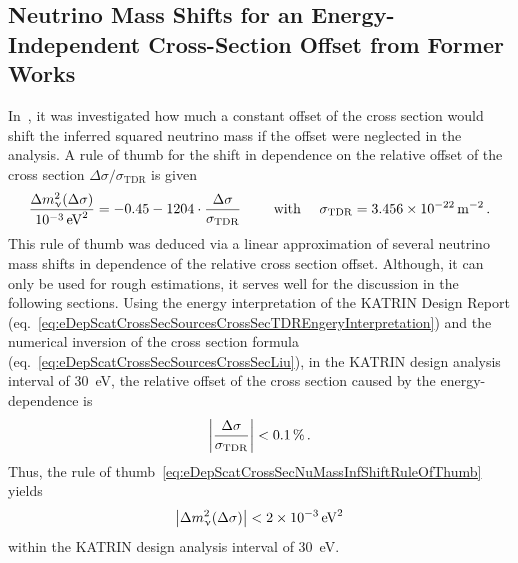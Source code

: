 \subsection{Neutrino Mass Shifts for an Energy-Independent Cross-Section Offset from Former Works}
\label{sec:eDepScatCrossSecNuMassInfGroh}
In~\cite{Groh2015}, it was investigated how much a constant offset of the cross section would shift the inferred squared neutrino mass if the offset were neglected in the analysis. A rule of thumb for the shift in dependence on the relative offset of the cross section $\Delta\sigma/\sigma_\mathrm{TDR}$ is given~\cite{Groh2015}
\begin{equation}
	\label{eq:eDepScatCrossSecNuMassInfShiftRuleOfThumb}
	\frac{\Delta m_\upnu^2(\Delta\sigma)}{\SI{e-3}{eV^2}} =
	-0.45
	-1204\cdot
	\frac{
		\Delta\sigma
	}{
		\sigma_\mathrm{TDR}
	}
	\qquad \text{ with } \quad 
	\sigma_\mathrm{TDR} = \SI{3.456e-22}{m^{-2}}
	\text{\,.}
\end{equation}
This rule of thumb was deduced via a linear approximation of several neutrino mass shifts in dependence of the relative cross section offset. Although, it can only be used for rough estimations, it serves well for the discussion in the following sections. Using the energy interpretation of the KATRIN Design Report (eq.~\ref{eq:eDepScatCrossSecSourcesCrossSecTDREngeryInterpretation}) and the numerical inversion of the cross section formula (eq.~\ref{eq:eDepScatCrossSecSourcesCrossSecLiu}), in the KATRIN design analysis interval of \SI{30}{eV}, the relative offset of the cross section caused by the energy-dependence is
\begin{equation}
	\label{eq:eDepScatCrossSecNuMassInfRelativeCrossSecOffset}
	\left|
	\frac{
		\Delta\sigma
	}{
		\sigma_\mathrm{TDR}
	}
	\right| < \SI{0.1}{\percent}
	\text{\,.}
\end{equation}
Thus, the rule of thumb~\eqref{eq:eDepScatCrossSecNuMassInfShiftRuleOfThumb} yields
\begin{equation}
	\label{eq:eDepScatCrossSecNuMassInfShiftEstimate}
	\left|
		\Delta m_\upnu^2(\Delta\sigma)
	\right| < \SI{2e-3}{eV^2} 
\end{equation}
within the KATRIN design analysis interval of \SI{30}{eV}.

